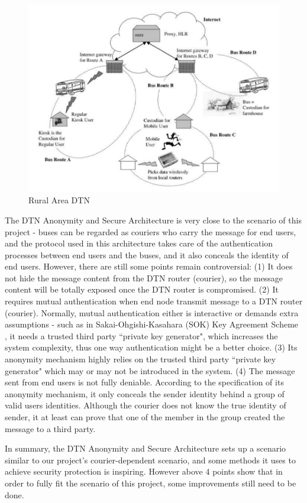 \begin{figure}[h!]
\centering
\includegraphics[width=\textwidth,natwidth=913,natheight=682]{figures/ruralarea.png}
\caption{Rural Area DTN \cite{Seth}}
\label{fig:ruralarea}
\end{figure}

The DTN Anonymity and Secure Architecture is very close to the scenario of this project - buses can be regarded as couriers who carry the message for end users, and the protocol used in this architecture takes care of the authentication processes between end users and the buses, and it also conceals the identity of end users. However, there are still some points remain controversial: (1) It does not hide the message content from the DTN router (courier), so the message content will be totally exposed once the DTN router is compromised. (2) It requires mutual authentication when end node transmit message to a DTN router (courier). Normally, mutual authentication either is interactive or demands extra assumptions - such as in Sakai-Ohgishi-Kasahara (SOK) Key Agreement Scheme \cite{Sakai}, it needs a trusted third party ``private key generator", which increases the system complexity, thus one way authentication might be a better choice. (3) Its anonymity mechanism highly relies on the trusted third party ``private key generator" which may or may not be introduced in the system. (4) The message sent from end users is not fully deniable. According to the specification of its anonymity mechanism, it only conceals the sender identity behind a group of valid users identities. Although the courier does not know the true identity of sender, it at least can prove that one of the member in the group created the message to a third party.

In summary, the DTN Anonymity and Secure Architecture sets up a scenario similar to our project's courier-dependent scenario, and some methods it uses to achieve security protection is inspiring. However above 4 points show that in order to fully fit the scenario of this project, some improvements still need to be done.